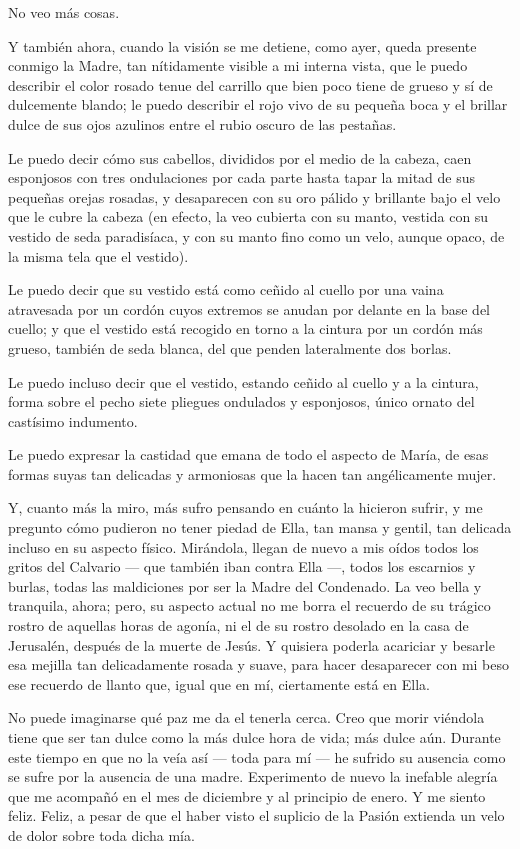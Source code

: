 \documentclass[12pt, twoside, openright]{book} %
\begin{document}
No veo más cosas. 

Y también ahora, cuando la visión se me detiene, como ayer, queda presente conmigo la Madre, tan nítidamente visible a mi interna vista, que le puedo describir el color rosado tenue del carrillo que bien poco tiene de grueso y sí de dulcemente blando; le puedo describir el rojo vivo de su pequeña boca y el brillar dulce de sus ojos azulinos entre el rubio oscuro de las pestañas. 

Le puedo decir cómo sus cabellos, divididos por el medio de la cabeza, caen esponjosos con tres ondulaciones por cada parte hasta tapar la mitad de sus pequeñas orejas rosadas, y desaparecen con su oro pálido y brillante bajo el velo que le cubre la cabeza (en efecto, la veo cubierta con su manto, vestida con su vestido de seda paradisíaca, y con su manto fino como un velo, aunque opaco, de la misma tela que el vestido). 

Le puedo decir que su vestido está como ceñido al cuello por una vaina atravesada por un cordón cuyos extremos se anudan por delante en la base del cuello; y que el vestido está recogido en torno a la cintura por un cordón más grueso, también de seda blanca, del que penden lateralmente dos borlas. 

Le puedo incluso decir que el vestido, estando ceñido al cuello y a la cintura, forma sobre el pecho siete pliegues ondulados y esponjosos, único ornato del castísimo indumento. 

Le puedo expresar la castidad que emana de todo el aspecto de María, de esas formas suyas tan delicadas y armoniosas que la hacen tan angélicamente mujer. 

Y, cuanto más la miro, más sufro pensando en cuánto la hicieron sufrir, y me pregunto cómo pudieron no tener piedad de Ella, tan mansa y gentil, tan delicada incluso en su aspecto físico. Mirándola, llegan de nuevo a mis oídos todos los gritos del Calvario — que también iban contra Ella —, todos los escarnios y burlas, todas las maldiciones por ser la Madre del Condenado. La veo bella y tranquila, ahora; pero, su aspecto actual no me borra el recuerdo de su trágico rostro de aquellas horas de agonía, ni el de su rostro desolado en la casa de Jerusalén, después de la muerte de Jesús. Y quisiera poderla acariciar y besarle esa mejilla tan delicadamente rosada y suave, para hacer desaparecer con mi beso ese recuerdo de llanto que, igual que en mí, ciertamente está en Ella. 

No puede imaginarse qué paz me da el tenerla cerca. Creo que morir viéndola tiene que ser tan dulce como la más dulce hora de vida; más dulce aún. Durante este tiempo en que no la veía así — toda para mí — he sufrido su ausencia como se sufre por la ausencia de una madre. Experimento de nuevo la inefable alegría que me acompañó en el mes de diciembre y al principio de enero. Y me siento feliz. Feliz, a pesar de que el haber visto el suplicio de la Pasión extienda un velo de dolor sobre toda dicha mía. 
\end{document}
